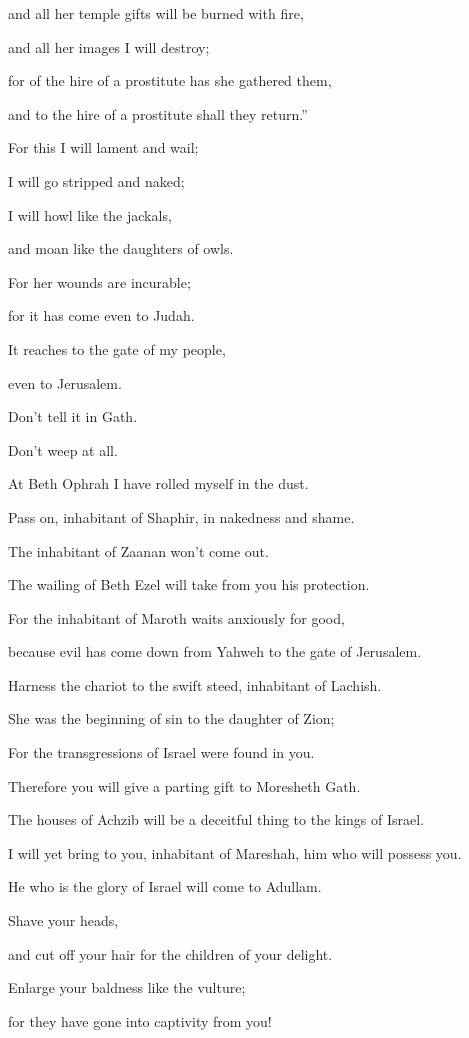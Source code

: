 {\par }{\QB and all her temple gifts will be burned with fire,
\par }{\QB and all her images I will destroy;
\par }{\Q for of the hire of a prostitute has she gathered them,
\par }{\QB and to the hire of a prostitute shall they return.”
\par }{\BB \par }{\Q {}For this I will lament and wail;
\par }{\QB I will go stripped and naked;
\par }{\QB I will howl like the jackals,
\par }{\QB and moan like the daughters of owls.
\par }{\Q {}For her wounds are incurable;
\par }{\QB for it has come even to Judah.
\par }{\Q It reaches to the gate of my people,
\par }{\QB even to Jerusalem.
\par }{\Q {}Don’t tell it in Gath.
\par }{\QB Don’t weep at all.
\par }{\QB At Beth Ophrah I have rolled myself in the dust.
\par }{\Q {}Pass on, inhabitant of Shaphir, in nakedness and shame.
\par }{\QB The inhabitant of Zaanan won’t come out.
\par }{\QB The wailing of Beth Ezel will take from you his protection.
\par }{\Q {}For the inhabitant of Maroth waits anxiously for good,
\par }{\QB because evil has come down from Yahweh to the gate of Jerusalem.
\par }{\Q {}Harness the chariot to the swift steed, inhabitant of Lachish.
\par }{\QB She was the beginning of sin to the daughter of Zion;
\par }{\QB For the transgressions of Israel were found in you.
\par }{\Q {}Therefore you will give a parting gift to Moresheth Gath.
\par }{\QB The houses of Achzib will be a deceitful thing to the kings of Israel.
\par }{\Q {}I will yet bring to you, inhabitant of Mareshah, him who will possess you.
\par }{\QB He who is the glory of Israel will come to Adullam.
\par }{\Q {}Shave your heads,
\par }{\QB and cut off your hair for the children of your delight.
\par }{\Q Enlarge your baldness like the vulture;
\par }{\QB for they have gone into captivity from you!
\par }{\BB \par }
